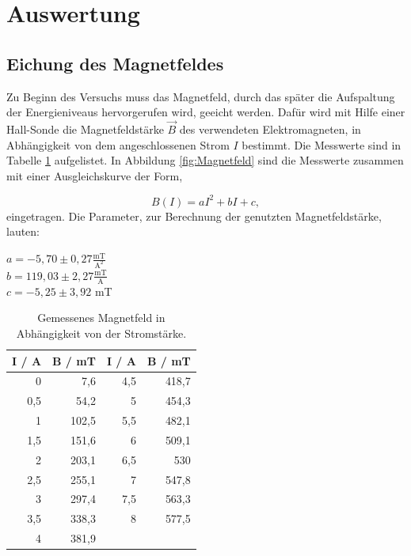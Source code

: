 \section{Auswertung}
\label{sec:Auswertung}

\subsection{Eichung des Magnetfeldes}
\label{sec:Magnetfeld}
Zu Beginn des Versuchs muss das Magnetfeld, durch das später die Aufspaltung der Energieniveaus hervorgerufen wird, geeicht werden. 
Dafür wird mit Hilfe einer Hall-Sonde die Magnetfeldstärke $\vec{B}$ des verwendeten Elektromagneten, in Abhängigkeit von dem 
angeschlossenen Strom $I$ bestimmt.
Die Messwerte sind in Tabelle \ref{tab:Magnetfeld} aufgelistet.
In Abbildung \ref{fig:Magnetfeld} sind die Messwerte zusammen mit einer Ausgleichskurve der Form,

\begin{equation}
  B(I) = a I^2 + b I + c ,
\end{equation}
  eingetragen.
  Die Parameter, zur Berechnung der genutzten Magnetfeldstärke, lauten: \\
  \begin{center}
  $a = -5,70 \pm 0,27 \frac{\text{mT}}{\text{A}^2}$ \\
  $b = 119,03 \pm 2,27 \frac{\text{mT}}{\text{A}}$ \\
  $c = -5,25 \pm 3,92$ mT \\
  \end{center}
 

\begin{table}
  \centering
  \footnotesize
  \caption{Gemessenes Magnetfeld in Abhängigkeit von der Stromstärke.}
  \label{tab:Magnetfeld}

  \begin{tabular}{r r | r r}
    \toprule
    I / A & B / mT & I / A & B / mT \\
    \midrule
    0   & 7,6   & 4,5   & 418,7 \\
    0,5 & 54,2  & 5     & 454,3 \\
    1   & 102,5 & 5,5   & 482,1 \\
    1,5 & 151,6 & 6     & 509,1 \\
    2   & 203,1 & 6,5   & 530   \\
    2,5 & 255,1 & 7     & 547,8 \\
    3   & 297,4 & 7,5   & 563,3 \\
    3,5 & 338,3 & 8     & 577,5 \\
    4   & 381,9 & & \\
    \bottomrule
  \end{tabular}
\end{table}

